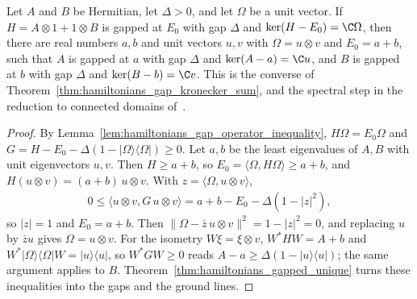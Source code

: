 \begin{theorem}
    \label{thm:hamiltonians_kronecker_sum_product_ground}
    \leanok
    Let $A$ and $B$ be Hermitian, let $\Delta>0$, and let $\Omega$ be a unit
    vector. If $H=A\otimes1+1\otimes B$ is gapped at $E_0$ with gap $\Delta$ and
    $\ker(H-E_0)=\C\Omega$, then there are real numbers $a,b$ and unit vectors
    $u,v$ with $\Omega=u\otimes v$ and $E_0=a+b$, such that $A$ is gapped at $a$
    with gap $\Delta$ and $\ker(A-a)=\C u$, and $B$ is gapped at $b$ with gap
    $\Delta$ and $\ker(B-b)=\C v$. This is the converse of
    Theorem~\ref{thm:hamiltonians_gap_kronecker_sum}, and the spectral step in
    the reduction to connected domains
    of~\cite[Part~I]{TNLean2026OneDimensional}.
\end{theorem}
\begin{proof}\leanok
    By Lemma~\ref{lem:hamiltonians_gap_operator_inequality},
    $H\Omega=E_0\Omega$ and
    $G=H-E_0-\Delta(1-\lvert\Omega\rangle\langle\Omega\rvert)\ge0$. Let $a,b$
    be the least eigenvalues of $A,B$ with unit eigenvectors $u,v$. Then
    $H\ge a+b$, so $E_0=\langle\Omega,H\Omega\rangle\ge a+b$, and
    $H(u\otimes v)=(a+b)\,u\otimes v$. With $z=\langle\Omega,u\otimes v\rangle$,
    \begin{align}
        0\le\langle u\otimes v,G\,u\otimes v\rangle=a+b-E_0-\Delta(1-\lvert z\rvert^2),
    \end{align}
    so $\lvert z\rvert=1$ and $E_0=a+b$. Then
    $\lVert\Omega-\bar z\,u\otimes v\rVert^2=1-\lvert z\rvert^2=0$, and
    replacing $u$ by $\bar zu$ gives $\Omega=u\otimes v$. For the isometry
    $W\xi=\xi\otimes v$, $W^*HW=A+b$ and
    $W^*\lvert\Omega\rangle\langle\Omega\rvert W=\lvert u\rangle\langle u\rvert$,
    so $W^*GW\ge0$ reads $A-a\ge\Delta(1-\lvert u\rangle\langle u\rvert)$; the
    same argument applies to $B$. Theorem~\ref{thm:hamiltonians_gapped_unique}
    turns these inequalities into the gaps and the ground lines.
\end{proof}

